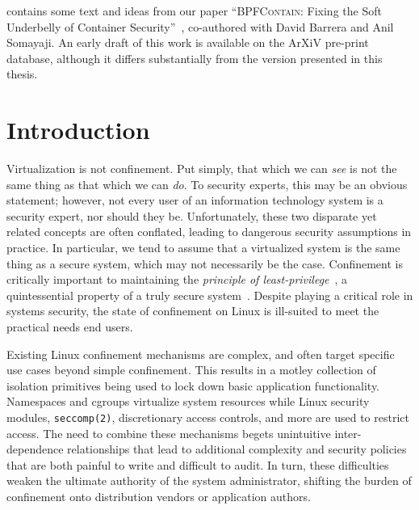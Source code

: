 \documentclass[
  fontsize=12pt,
  titlepage=firstiscover,
  paper=letter,
oneside,
  cleardoublepage=plain,
  parskip=half-,
  DIV=10,
  parindent,
  appendixprefix,
  chapterprefix,
  listof=totoc,
]{scrbook}
\newcommand{\bpfcontain}{\textsc{BPFContain}}
\begin{document}
 contains some text and ideas from our paper \enquote{\bpfcontain{}:
Fixing the Soft Underbelly of Container Security}~\cite{findlay2021_bpfcontain},
co-authored with David Barrera and Anil Somayaji. An early draft of this work is available
on the ArXiV pre-print database, although it differs substantially from the version
presented in this thesis.
\endgroup
\cleardoublepage 

\begingroup
\hypersetup{linkcolor=black}
\tableofcontents
\begin{singlespace}
\listoffigures
\listoftables
\lstlistoflistings
\end{singlespace}
\endgroup

\mainmatter 



\chapter{Introduction}\label{c:introduction}












Virtualization is not confinement. Put simply, that which we can \textit{see} is not the
same thing as that which we can \textit{do}. To security experts, this may be an obvious
statement; however, not every user of an information technology system is a security
expert, nor should they be. Unfortunately, these two disparate yet related concepts are
often conflated, leading to dangerous security assumptions in practice. In particular, we
tend to assume that a virtualized system is the same thing as a secure system, which may
not necessarily be the case. Confinement is critically important to maintaining the
\textit{principle of least-privilege}~\cite{schneider03_least_privilege}, a quintessential
property of a truly secure system~\cite{van_oorschot2020_tools_jewels}. Despite playing
a critical role in systems security, the state of confinement on Linux is ill-suited to
meet the practical needs end users.

Existing Linux confinement mechanisms are complex, and often target specific use cases
beyond simple confinement. This results in a motley collection of isolation primitives
being used to lock down basic application functionality. Namespaces and cgroups virtualize
system resources while Linux security modules, \texttt{seccomp(2)}, discretionary access
controls, and more are used to restrict access. The need to combine these mechanisms
begets unintuitive inter-dependence relationships that lead to additional complexity and
security policies that are both painful to write and difficult to audit. In turn, these
difficulties weaken the ultimate authority of the system administrator, shifting the
burden of confinement onto distribution vendors or application authors.
\end{document}
